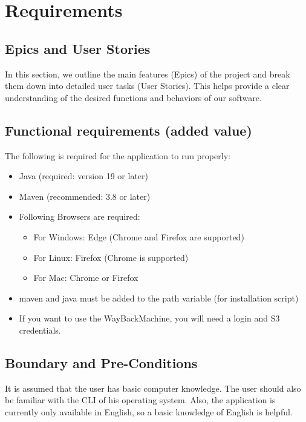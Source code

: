 \section{Requirements}

\subsection{Epics and User Stories}
In this section, we outline the main features (Epics) of the project and break them down into detailed user tasks (User Stories). This helps provide a clear understanding of the desired functions and behaviors of our software.






\subsection{Functional requirements (added value)}
The following is required for the application to run properly: 
\begin{itemize}
    \item Java (required: version 19 or later)
    \item Maven (recommended: 3.8 or later)
    \item Following Browsers are required: 
    \begin{itemize}
        \item For Windows: Edge (Chrome and Firefox are supported)
        \item For Linux: Firefox (Chrome is supported)
        \item For Mac: Chrome or Firefox
    \end{itemize}
    \item maven and java must be added to the path variable (for installation script)
    \item If you want to use the WayBackMachine, you will need a login and S3 credentials.
\end{itemize}

\subsection{Boundary and Pre-Conditions}
It is assumed that the user has basic computer knowledge. The user should also be familiar with the CLI of his operating system.
Also, the application is currently only available in English, so a basic knowledge of English is helpful.